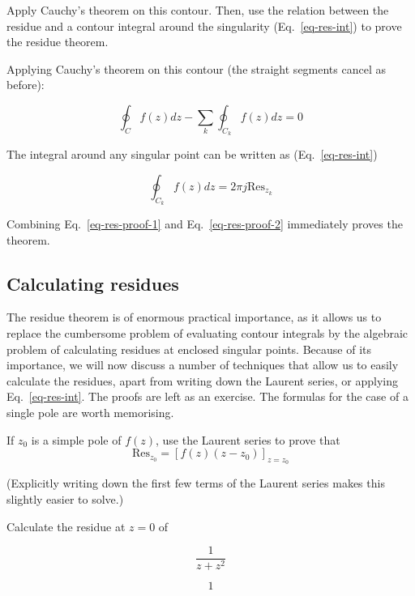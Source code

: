 \begin{cue}
  Apply Cauchy's theorem on this contour. Then, use the relation between the residue and a contour integral around the singularity (Eq.~\ref{eq-res-int}) to prove the residue theorem. 
\end{cue}

Applying Cauchy's theorem on this contour (the straight segments cancel as before):

\begin{equation}
\oint_{{C}} f(z) dz - \sum_k \oint_{{C}_k} f(z) dz = 0
\label{eq-res-proof-1}
\end{equation}

The integral around any singular point can be written as (Eq.~\ref{eq-res-int})

\begin{equation}
\oint_{{C}_k} f(z) dz = 2 \pi j \mathrm{Res}_{z_k} \label{eq-res-proof-2}
\end{equation} 

Combining Eq.~\ref{eq-res-proof-1} and Eq.~\ref{eq-res-proof-2} immediately proves the theorem.

\pagebreak

\subsection*{Calculating residues}

The residue theorem is of enormous practical importance, as it allows us to replace the cumbersome problem of evaluating contour integrals by the algebraic problem of calculating residues at enclosed singular points. Because of its importance, we will now discuss a number of techniques that allow us to easily calculate the residues, apart from writing down the Laurent series, or applying Eq.~\ref{eq-res-int}. The proofs are left as an exercise. The formulas for the case of a single pole are worth memorising.

\begin{exer}
  If $z_0$ is a simple pole of $f(z)$, use the Laurent series to prove that
  $$\mathrm{Res}_{z_0} = \left[f(z)(z-z_0)\right]_{z=z_0}$$

  (Explicitly writing down the first few terms of the Laurent series makes this slightly easier to solve.)
  
\label{ex-res1}
\end{exer}

\begin{exer}
  Calculate the residue at $z=0$ of

   $$\frac{1}{z+z^2}$$ 
\begin{sol}
  $$1$$
\end{sol}
\end{exer}

